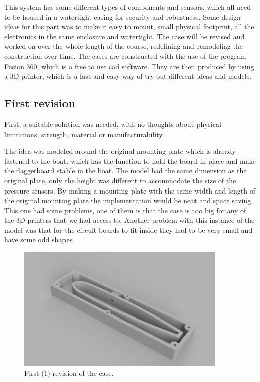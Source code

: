 
This system has some different types of components and sensors, which all need to be housed in a watertight casing for security and robustness. Some design ideas for this part was to make it easy to mount, small physical footprint, all the electronics in the same enclosure and watertight.  
The case will be revised and worked on over the whole length of the course, redefining and remodeling the construction over time.  
The cases are constructed with the use of the program Fusion 360, which is a free to use \gls{cad} software. They are then produced by using a 3D printer, which is a fast and easy way of try out different ideas and models.   

\subsection{First revision}
First, a suitable solution was needed, with no thoughts about physical limitations, strength, material or manufacturability.  

The idea was modeled around the original mounting plate which is already fastened to the boat, which has the function to hold the board in place and make the daggerboard stable in the boat. The model had the same dimension as the original plate, only the height was different to accommodate the size of the pressure sensors. By making a mounting plate with the same width and length of the original mounting plate the implementation would be neat and space saving. 
This one had some problems, one of them is that the case is too big for any of the 3D-printers that we had access to. Another problem with this instance of the model was that for the circuit boards to fit inside they had to be very small and have some odd shapes.  



\begin{figure}[H]
\begin{center}
	\includegraphics[width = 10cm]{Figures/Case_rev_1.png}
	\caption{First (1) revision of the case.}
	\label{Case_rev_1}
\end{center}
\end{figure}

